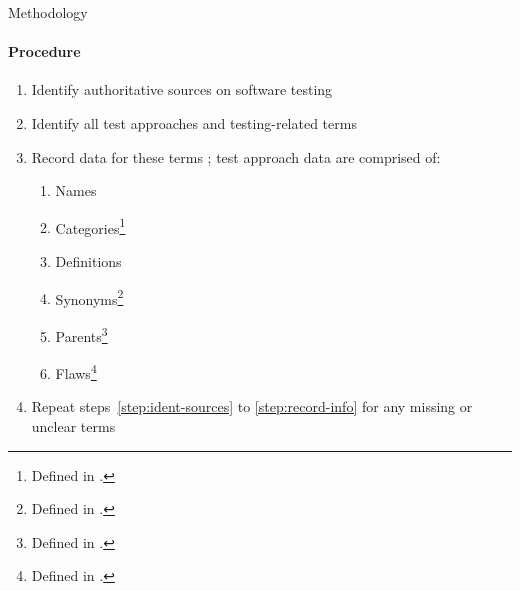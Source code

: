 \begin{frame}{Methodology}
    \framesubtitle{Procedure}
    \rqa{}
    \vspace{0.75cm}
    \begin{enumerate}
        \item {}\label{step:ident-sources}
              Identify authoritative sources on software testing
        \item {}\label{step:ident-terms}
              Identify all test approaches and testing-related terms
        \item {}\label{step:record-info}
              Record data for these terms%
              ; test approach data are comprised of:
              \vspace*{-0.4cm}\begin{multicols}{3}\begin{enumerate}
                      \item Names
                      \item Categories\footnote{Defined in .}
                      \item Definitions
                      \item Synonyms\footnote{Defined in .}
                      \item Parents\footnote{Defined in .}
                      \item Flaws\footnote{Defined in .}%
                            \label{manual-flaws}
                  \end{enumerate}\end{multicols}\vspace*{-0.4cm}
        \item {}\label{step:repeat-process}
              Repeat steps~\ref{step:ident-sources} to \ref{step:record-info} for
              any missing or unclear terms  %
              \setcounter{methodCounter}{\value{enumi}}
    \end{enumerate}
    \vspace{1.3cm}
\end{frame}

